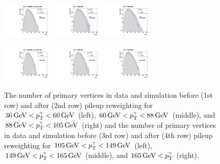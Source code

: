 \begin{figure}[ht]
    \includegraphics[width=0.22\textwidth]{figures/resolution/eventSelection/NVtxComparisonWoWeights4.pdf}
    \includegraphics[width=0.22\textwidth]{figures/resolution/eventSelection/NVtxComparisonWoWeights5.pdf}
    \includegraphics[width=0.22\textwidth]{figures/resolution/eventSelection/NVtxComparisonWoWeights6.pdf}

    \includegraphics[width=0.22\textwidth]{figures/resolution/eventSelection/NVtxComparison4.pdf}
    \includegraphics[width=0.22\textwidth]{figures/resolution/eventSelection/NVtxComparison5.pdf}
    \includegraphics[width=0.22\textwidth]{figures/resolution/eventSelection/NVtxComparison6.pdf}
   \caption{The number of primary vertices in data and simulation before (1st row) and after (2nd row) pileup reweighting for $36\,\text{Ge}\kern-0.06667em\text{V} < p_{\text{T}}^{\gamma} < 60\,\text{Ge}\kern-0.06667em\text{V}$ (left), $60\,\text{Ge}\kern-0.06667em\text{V} < p_{\text{T}}^{\gamma} < 88\,\text{Ge}\kern-0.06667em\text{V}$ (middle), 
            and $88\,\text{Ge}\kern-0.06667em\text{V} < p_{\text{T}}^{\gamma} < 105\,\text{Ge}\kern-0.06667em\text{V}$ (right) and the number of primary vertices in data and simulation before (3rd row) and after (4th row) pileup reweighting for $105\,\text{Ge}\kern-0.06667em\text{V} < p_{\text{T}}^{\gamma} < 149\,\text{Ge}\kern-0.06667em\text{V}$ (left), 
            $149\,\text{Ge}\kern-0.06667em\text{V} < p_{\text{T}}^{\gamma} < 165\,\text{Ge}\kern-0.06667em\text{V}$ (middle), and $165\,\text{Ge}\kern-0.06667em\text{V} < p_{\text{T}}^{\gamma}$ (right).}
  \label{res:fig:PUreweighting}
\end{figure}



